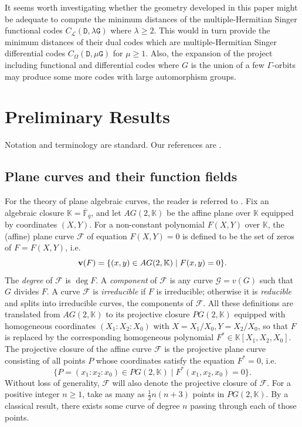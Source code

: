 \documentclass[9pt]{article}
\theoremstyle{plain}
\begin{document}
It seems worth investigating whether the geometry developed in this paper might be adequate to compute the minimum distances of the multiple-Hermitian Singer functional codes $C_{\mathcal{L}}(\mathtt{D},\lambda\mathtt{G})$ where $\lambda\ge 2$. This would in turn provide the minimum distances of their dual codes which are multiple-Hermitian Singer differential codes $C_\Omega(\mathtt{D},\mu\mathtt{G})$ for $\mu\ge 1$. Also, the expansion of the project including functional and differential codes where $G$ is the union of a few $\Gamma$-orbits may produce some more codes with large automorphism groups. 





\section{Preliminary Results}\label{sec2}
Notation and terminology are standard. Our references are \cite{Hirschfeld1,HKT,hughes-piper1973,P}.
\subsection{Plane curves and their function fields}
For the theory of plane algebraic curves, the reader is referred to \cite[Chapters 1-5]{HKT}. Fix an algebraic closure $\mathbb{K}=\overline{\mathbb{F}}_q$, and let $AG(2, \mathbb{K})$ be the affine plane over $\mathbb{K}$ equipped by coordinates $(X,Y)$. For a non-constant polynomial $F(X,Y)$ over $\mathbb{K}$, the (affine) plane curve $\mathcal F$ of equation $F(X,Y)=0$ is defined to be the set of zeros of $F=F(X,Y)$, i.e.
\[{\bf{v}}(F)=\{(x, y)\in AG(2,\mathbb{K})\mid F(x, y) = 0\}.\]
The \textit{degree} of $\mathcal{F}$ is $\deg F$. A \textit{component} of $\mathcal F$ is any curve $\mathcal{G}=v(G)$ such that $G$ divides $F$. A curve $\mathcal F$ is \textit{irreducible} if $F$ is irreducible; otherwise it is \textit{reducible} and splits into irreducible curves, the components of $\mathcal{F}$. All these definitions are translated from $AG(2,\mathbb{K})$ to its projective closure $PG(2, \mathbb{K})$ equipped with homogeneous coordinates $(X_1:X_2:X_0)$ with $X=X_1/X_0,Y=X_2/X_0$, so that $F$ is replaced by the corresponding homogeneous polynomial $F^*\in \mathbb{K}[X_1,X_2,X_0]$. The projective closure of the affine curve $\mathcal{F}$ is the projective plane curve consisting of all points $P$ whose coordinates satisfy the equation $F^*=0$, i.e.
\[\{P=(x_1:x_2:x_0) \in PG(2,\mathbb{K})\mid F^*(x_1,x_2,x_0)= 0\}.\]
Without loss of generality, $\mathcal{F}$ will also denote the projective closure of $\mathcal{F}$. For a positive integer $n\ge 1$, take as many as $\frac{1}{2}n(n+3)$ points in $PG(2,\mathbb{K})$. By a classical result, there exists some curve of degree $n$ passing through each of those points.  
\end{document}
